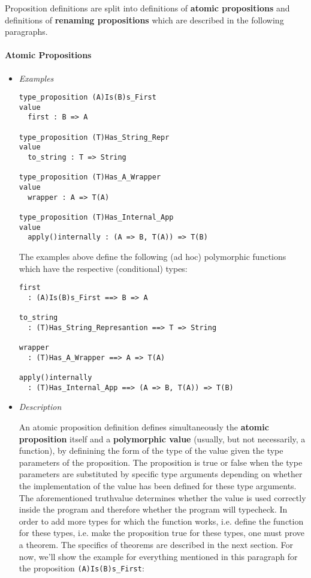 \documentclass{article}
\begin{document}
Proposition definitions are split into definitions of \textbf{atomic
propositions} and definitions of \textbf{renaming propositions} which are
described in the following paragraphs.

\paragraph{Atomic Propositions}

\begin{itemize}
\item \textit{Examples}
\begin{verbatim}
type_proposition (A)Is(B)s_First
value
  first : B => A

type_proposition (T)Has_String_Repr
value
  to_string : T => String

type_proposition (T)Has_A_Wrapper
value
  wrapper : A => T(A)

type_proposition (T)Has_Internal_App
value
  apply()internally : (A => B, T(A)) => T(B)
\end{verbatim}
The examples above define the following (ad hoc) polymorphic functions which
have the respective (conditional) types:
\begin{verbatim}
first
  : (A)Is(B)s_First ==> B => A

to_string
  : (T)Has_String_Represantion ==> T => String

wrapper
  : (T)Has_A_Wrapper ==> A => T(A)

apply()internally
  : (T)Has_Internal_App ==> (A => B, T(A)) => T(B)
\end{verbatim}

\item \textit{Description}

An atomic proposition definition defines simultaneously the \textbf{atomic
proposition} itself and a \textbf{polymorphic value} (usually, but not
necessarily, a function), by definining the form of the type of the value given
the type parameters of the proposition. The proposition is true or false when
the type parameters are substituted by specific type arguments depending on
whether the implementation of the value has been defined for these type
arguments. The aforementioned truthvalue determines whether the value is used
correctly inside the program and therefore whether the program will typecheck.
In order to add more types for which the function works, i.e.  define the
function for these types, i.e. make the proposition true for these types, one
must prove a theorem. The specifics of theorems are described in the next
section. For now, we'll show the example for everything mentioned in this
paragraph for the proposition \texttt{(A)Is(B)s_First}:


\end{itemize}
\end{document}
